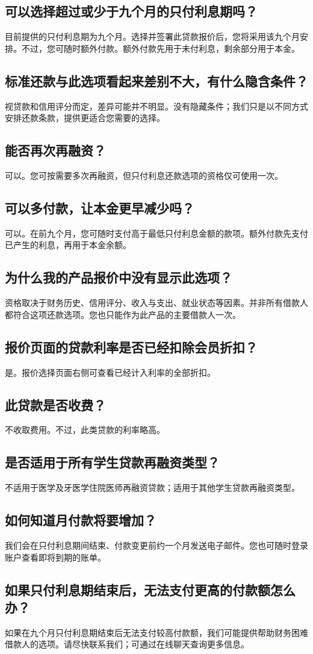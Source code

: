 \documentclass[UTF8,fontset=none,11pt,a4paper]{ctexart}
\begin{document}
\subsection*{可以选择超过或少于九个月的只付利息期吗？}
目前提供的只付利息期为九个月。选择并签署此贷款报价后，您将采用该九个月安排。不过，您可随时额外付款。额外付款先用于未付利息，剩余部分用于本金。


\subsection*{标准还款与此选项看起来差别不大，有什么隐含条件？}
视贷款和信用评分而定，差异可能并不明显。没有隐藏条件；我们只是以不同方式安排还款条款，提供更适合您需要的选择。


\subsection*{能否再次再融资？}
可以。您可按需要多次再融资，但只付利息还款选项的资格仅可使用一次。


\subsection*{可以多付款，让本金更早减少吗？}
可以。在前九个月，您可随时支付高于最低只付利息金额的款项。额外付款先支付已产生的利息，再用于本金余额。


\subsection*{为什么我的产品报价中没有显示此选项？}
资格取决于财务历史、信用评分、收入与支出、就业状态等因素。并非所有借款人都符合这项还款选项。您也只能作为此产品的主要借款人一次。


\subsection*{报价页面的贷款利率是否已经扣除会员折扣？}
是。报价选择页面右侧可查看已经计入利率的全部折扣。


\subsection*{此贷款是否收费？}
不收取费用。不过，此类贷款的利率略高。


\subsection*{是否适用于所有学生贷款再融资类型？}
不适用于医学及牙医学住院医师再融资贷款；适用于其他学生贷款再融资类型。


\subsection*{如何知道月付款将要增加？}
我们会在只付利息期间结束、付款变更前约一个月发送电子邮件。您也可随时登录账户查看即将到期的账单。


\subsection*{如果只付利息期结束后，无法支付更高的付款额怎么办？}
如果在九个月只付利息期结束后无法支付较高付款额，我们可能提供帮助财务困难借款人的选项。请尽快联系我们；可通过在线聊天查询更多信息。
\end{document}
